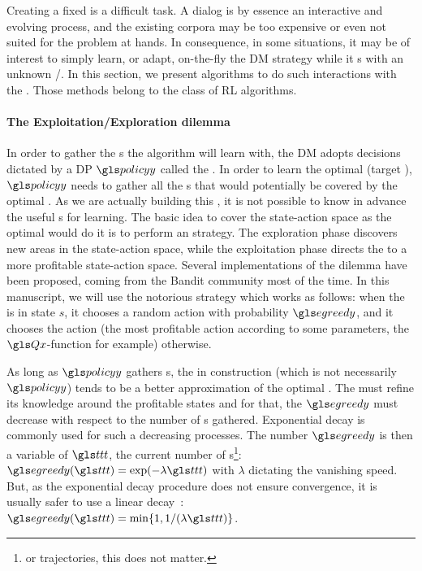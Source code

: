 Creating a fixed  is a difficult task. 
A dialog is by essence an interactive and evolving process, and the existing corpora may be too expensive or even not suited for the problem at hands.
In consequence, in some situations, it may be of interest to simply learn, or adapt, on-the-fly the \gls{DM} strategy while it s with an unknown /. In this section, we present algorithms to do such interactions with the . Those methods belong to the class of  \gls{RL} algorithms.

\paragraph{The Exploitation/Exploration dilemma}

In order to gather the s the algorithm will learn with, the \gls{DM} adopts decisions dictated by a \gls{DP} $\policy$ called the . In order to learn the optimal  (target ), $\policy$ needs to gather all the s that would potentially be covered by the optimal . As we are actually building this , it is not possible to know in advance the useful s for learning. The basic idea to cover the state-action space as the optimal  would do it is to perform an  strategy. The exploration phase discovers new areas in the state-action space, while the exploitation phase directs the  to a more profitable state-action space. Several implementations of the  dilemma have been proposed, coming from the Bandit community most of the time. In this manuscript, we will use the notorious  strategy which works as follows:
when the  is in state $s$, it chooses a random  action with probability $\egreedy$, and it chooses the  action (the most profitable action according to some parameters, the $\Q$-function for example) otherwise.

As long as $\policy$ gathers s, the  in construction (which is not necessarily  $\policy$) tends to be a better approximation of the optimal . The  must refine its knowledge around the profitable states and for that, the $\egreedy$ must decrease with respect to the number of s gathered.
Exponential decay is commonly used for such a decreasing processes.
The number $\egreedy$ is then a variable of {${\indextransition}$}, the current number of s\footnote{or trajectories, this does not matter.}: $\egreedy({{\indextransition}}) = \exp(-{\lambda} {{\indextransition}})$ with {$\lambda$} dictating the vanishing speed. But, as the exponential decay procedure does not ensure convergence, it is usually safer to use a linear decay~\parencite{auer2002finite}:
$\egreedy({{\indextransition}}) = \min\{1,1/(\lambda\indextransition)\}$.


